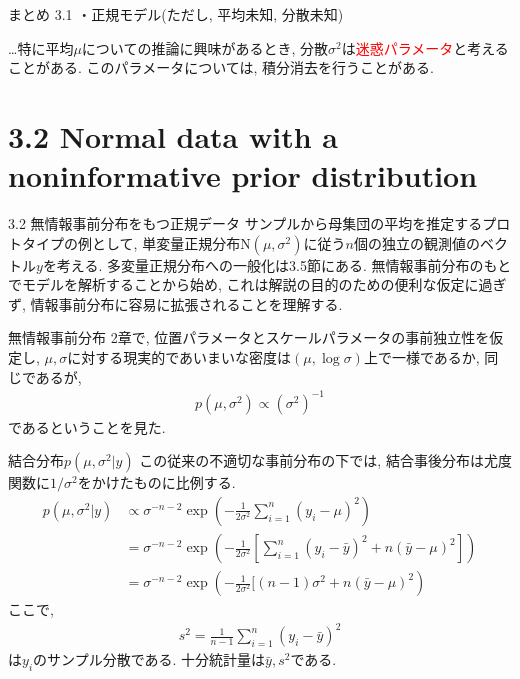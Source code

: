 \documentclass[10pt,dvipdfmx,a4]{beamer}
\newcommand{\eq}[1]{\begin{align}#1\end{align}}
\newcommand{\eqn}[1]{\begin{align*}#1\end{align*}}
\newcommand{\tcr}[1]{\textcolor{red}{#1}}
\begin{document}

\begin{frame}{まとめ 3.1}
・正規モデル(ただし, 平均未知, 分散未知)

…特に平均$\mu$についての推論に興味があるとき, 分散$\sigma^2$は\tcr{迷惑パラメータ}と考えることがある.
このパラメータについては, 積分消去を行うことがある.
\end{frame}

\section{3.2 Normal data with a noninformative prior distribution}
\begin{frame}{3.2 無情報事前分布をもつ正規データ}
サンプルから母集団の平均を推定するプロトタイプの例として, 単変量正規分布$\text{N}(\mu,\sigma^2)$に従う$n$個の独立の観測値のベクトル$y$を考える.
多変量正規分布への一般化は3.5節にある.
無情報事前分布のもとでモデルを解析することから始め, これは解説の目的のための便利な仮定に過ぎず, 情報事前分布に容易に拡張されることを理解する.
\end{frame}


\begin{frame}{無情報事前分布}
2章で, 位置パラメータとスケールパラメータの事前独立性を仮定し, $\mu, \sigma$に対する現実的であいまいな密度は$(\mu, \log \sigma)$上で一様であるか, 同じであるが,
\eqn{p(\mu,\sigma^2)\propto (\sigma^2)^{-1}}
であるということを見た.
\end{frame}


\begin{frame}{結合分布$p(\mu,\sigma^2|y)$}
この従来の不適切な事前分布の下では, 結合事後分布は尤度関数に$1/\sigma^2$をかけたものに比例する.
\eq{p(\mu,\sigma^2|y)&\propto\sigma^{-n-2}\exp\left(-\frac{1}{2\sigma^2}\sum_{i=1}^n(y_i-\mu)^2\right)\nonumber\\
&=\sigma^{-n-2}\exp\left(-\frac{1}{2\sigma^2} \left[ \sum_{i=1}^n(y_i-\bar{y})^2+n(\bar{y}-\mu)^2 \right]\right)\nonumber\\
&=\sigma^{-n-2}\exp\left(-\frac{1}{2\sigma^2}[(n-1)\sigma^2+n(\bar{y}-\mu)^2\right)}
ここで, 
\eqn{s^2=\frac{1}{n-1}\sum_{i=1}^n(y_i-\bar{y})^2}
は$y_i$のサンプル分散である.
十分統計量は$\bar{y}, s^2$である.
\end{frame}
\end{document}
